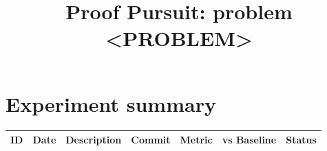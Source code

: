 \documentclass{article}
\title{Proof Pursuit: problem <PROBLEM>}
\theoremstyle{remark}\newtheorem{remark}{Remark}
\begin{document}
\maketitle

\section*{Experiment summary}
\begin{tabular}{lllllll}
\toprule
ID & Date & Description & Commit & Metric & vs Baseline & Status \\
\midrule
\bottomrule
\end{tabular}
\end{document}
